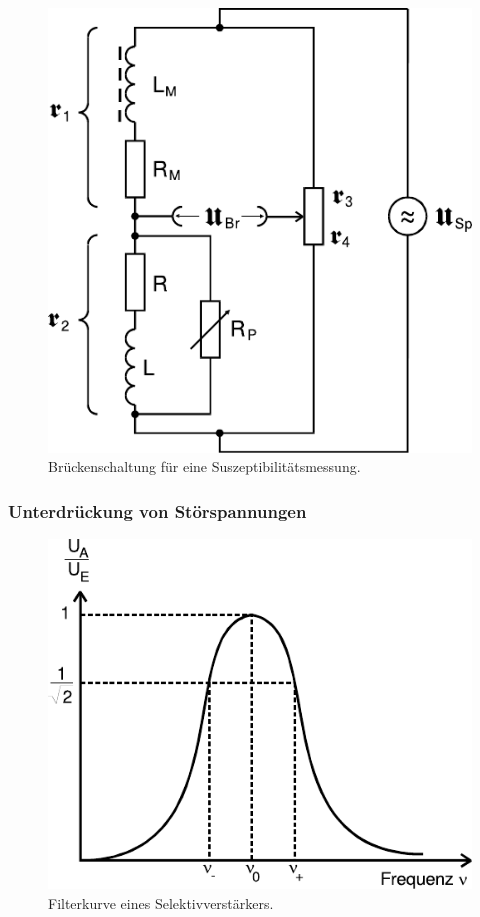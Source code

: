\begin{figure}[H]
	\label{fig:schaltung}
	\centering
	\includegraphics{content/schaltung.pdf}
	\caption{Brückenschaltung für eine Suszeptibilitätsmessung.}
\end{figure}

\subsubsection{Unterdrückung von Störspannungen}

\begin{figure}[H]
	\label{fig:kurve}
	\centering
	\includegraphics{content/kurve.pdf}
	\caption{Filterkurve eines Selektivverstärkers.}
\end{figure}

